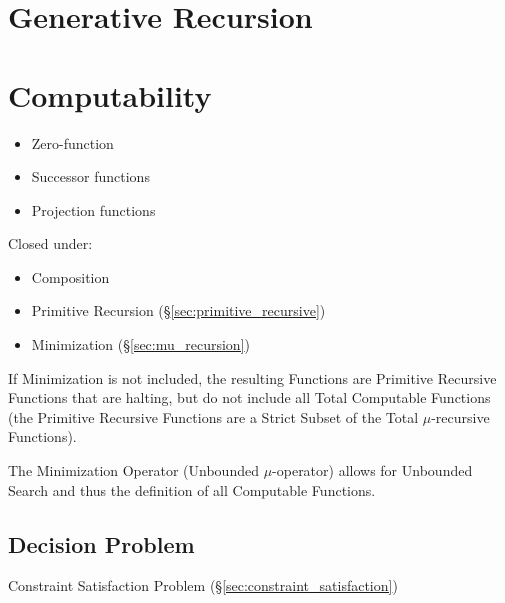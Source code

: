 \section{Generative Recursion}\label{sec:generative_recursion}

\section{Computability}\label{sec:computability}

\begin{itemize}
\item Zero-function
\item Successor functions
\item Projection functions
\end{itemize}

Closed under:

\begin{itemize}
\item Composition
\item Primitive Recursion (\S\ref{sec:primitive_recursive})
\item Minimization (\S\ref{sec:mu_recursion})
\end{itemize}

If Minimization is not included, the resulting Functions are Primitive
Recursive Functions that are halting, but do not include all Total
Computable Functions (the Primitive Recursive Functions are a Strict
Subset of the Total $\mu$-recursive Functions).

The Minimization Operator (Unbounded $\mu$-operator) allows for
Unbounded Search and thus the definition of all Computable Functions.



\subsection{Decision Problem}\label{sec:decision_problem}

\fist Constraint Satisfaction Problem
(\S\ref{sec:constraint_satisfaction})

